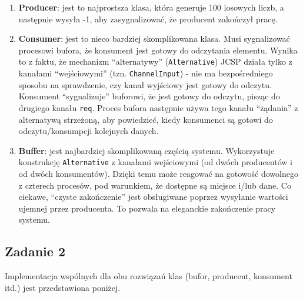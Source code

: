 \documentclass[11pt]{article}
\begin{document}
\begin{enumerate}
\def\labelenumi{\arabic{enumi}.}
\item
  \textbf{Producer}: jest to najprostsza klasa, która generuje 100
  losowych liczb, a następnie wysyła -1, aby zasygnalizować, że
  producent zakończył pracę.
\item
  \textbf{Consumer}: jest to nieco bardziej skomplikowana klasa. Musi
  sygnalizować procesowi bufora, że konsument jest gotowy do odczytania
  elementu. Wynika to z faktu, że mechanizm ``alternatywy''
  (\texttt{Alternative}) JCSP działa tylko z kanałami ``wejściowymi''
  (tzn. \texttt{ChannelInput}) - nie ma bezpośredniego sposobu na
  sprawdzenie, czy kanał wyjściowy jest gotowy do odczytu. Konsument
  ``sygnalizuje'' buforowi, że jest gotowy do odczytu, pisząc do
  drugiego kanału \texttt{req}. Proces bufora następnie używa tego
  kanału ``żądania'' z alternatywą strzeżoną, aby powiedzieć, kiedy
  konsumenci są gotowi do odczytu/konsumpcji kolejnych danych.
\item
  \textbf{Buffer}: jest najbardziej skomplikowaną częścią systemu.
  Wykorzystuje konstrukcję \texttt{Alternative} z kanałami wejściowymi
  (od dwóch producentów i od dwóch konsumentów). Dzięki temu może
  reagować na gotowość dowolnego z czterech procesów, pod warunkiem, że
  dostępne są miejsce i/lub dane. Co ciekawe, ``czyste zakończenie''
  jest obsługiwane poprzez wysyłanie wartości ujemnej przez producenta.
  To pozwala na eleganckie zakończenie pracy systemu.
\end{enumerate}

    \hypertarget{zadanie-2}{%
\subsection{Zadanie 2}\label{zadanie-2}}

Implementacja wspólnych dla obu rozwiązań klas (bufor, producent,
konsument itd.) jest przedstawiona poniżej.
\end{document}
